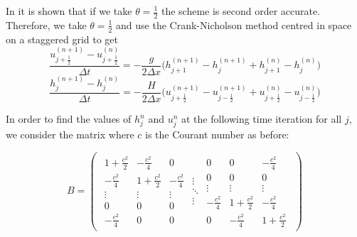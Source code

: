 \documentclass[a4paper, 10.8pt, notitlepage]{article}
\begin{document}
In \cite{implicit} it is shown that if we take $\theta = \frac{1}{2}$ the scheme is second order accurate. Therefore, we take $\theta = \frac{1}{2}$ and use the Crank-Nicholson method centred in space on a staggered grid to get
\begin{equation}\label{semiimplicit1}
\frac{u_{j + \frac{1}{2}}^{(n + 1)} - u_{j + \frac{1}{2}}^{(n)}}{\Delta t} = -\frac{g}{2\Delta x} \bigg(h_{j + 1}^{(n+ 1)} - h_{j}^{(n+ 1)} + h_{j + 1}^{(n)} - h_{j}^{(n)}\bigg)
\end{equation}
\begin{equation}\label{semiimplicit2}
\frac{h_{j}^{(n + 1)} - h_{j}^{(n)}}{\Delta t} = -\frac{H}{2\Delta x} \bigg(u_{j + \frac{1}{2}}^{(n+ 1)} - u_{j - \frac{1}{2}}^{(n+ 1)} + u_{j + \frac{1}{2}}^{(n)} - u_{j - \frac{1}{2}}^{(n)}\bigg)
\end{equation}

In order to find the values of $h_{j}^{n}$ and $u_{j}^{n}$ at the following time iteration for all $j$, we consider the matrix where $c$ is the Courant number as before:

\[
B = \left (
\begin{array}{ccc}
\begin{array}{ccc}
1 + \frac{c^{2}}{2} & -\frac{c^{2}}{4} & 0\\
-\frac{c^{2}}{4}& 1 + \frac{c^{2}}{2} & -\frac{c^{2}}{4} \\
\vdots & \vdots & \vdots\\
0 & 0  & 0 \\
- \frac{c^{2}}{4}  & 0  & 0 
\end{array}
\begin{array}{c}
\vdots\\ 
\ddots\\
\vdots
\end{array}
\begin{array}{ccc}
0  & 0  &  - \frac{c^{2}}{4}\\
0  & 0& 0\\
\vdots & \vdots & \vdots\\
-\frac{c^{2}}{4}& 1 + \frac{c^{2}}{2} & -\frac{c^{2}}{4} \\
0 & -\frac{c^{2}}{4} & 1 + \frac{c^{2}}{2}
\end{array}
\end{array}
\right )
\]
\end{document}
